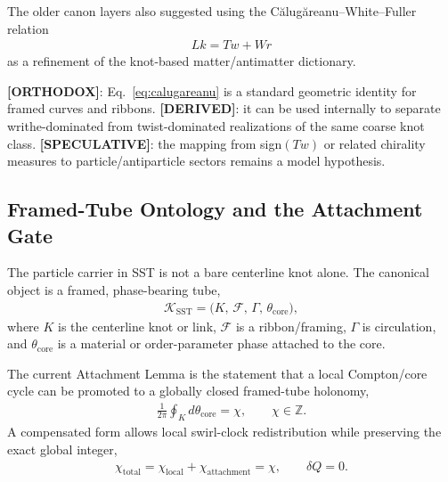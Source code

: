 \documentclass[11pt]{article}
\theoremstyle{definition}
\theoremstyle{plain}
\theoremstyle{remark}
\begin{document}
        The older canon layers also suggested using the C\u{a}lug\u{a}reanu--White--Fuller relation
        \begin{align}
            Lk = Tw + Wr
            \label{eq:calugareanu}
        \end{align}
        as a refinement of the knot-based matter/antimatter dictionary.

        \textbf{[ORTHODOX]}: Eq.~\eqref{eq:calugareanu} is a standard geometric identity for framed curves and ribbons.\newline
        \textbf{[DERIVED]}: it can be used internally to separate writhe-dominated from twist-dominated realizations of the same coarse knot class.\newline
        \textbf{[SPECULATIVE]}: the mapping from sign$(Tw)$ or related chirality measures to particle/antiparticle sectors remains a model hypothesis.


    \subsection{Framed-Tube Ontology and the Attachment Gate}
        \label{subsec:framed_tube_attachment_gate}

        The particle carrier in SST is not a bare centerline knot alone. The canonical object is a framed, phase-bearing tube,
        \begin{align}
            \mathcal{K}_{\mathrm{SST}}
            =
            \big(K,\,\mathcal{F},\,\Gamma,\,\theta_{\mathrm{core}}\big),
        \end{align}
        where $K$ is the centerline knot or link, $\mathcal{F}$ is a ribbon/framing, $\Gamma$ is circulation, and $\theta_{\mathrm{core}}$ is a material or order-parameter phase attached to the core.

        The current Attachment Lemma is the statement that a local Compton/core cycle can be promoted to a globally closed framed-tube holonomy,
        \begin{align}
            \frac{1}{2\pi}\oint_K d\theta_{\mathrm{core}}
            = \chi,
            \qquad
            \chi\in\mathbb{Z}.
            \label{eq:attachment_gate_chi}
        \end{align}
        A compensated form allows local swirl-clock redistribution while preserving the exact global integer,
        \begin{align}
            \chi_{\mathrm{total}}
            =
            \chi_{\mathrm{local}}+\chi_{\mathrm{attachment}}
            = \chi,
            \qquad
            \delta Q=0.
            \label{eq:compensated_attachment_gate}
        \end{align}
\end{document}
